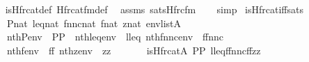 \begin{isabellebody}
%
\isadelimproof
\ \ %
\endisadelimproof
%
\isatagproof
{}\isamarkupfalse%
\ is{\isacharunderscore}{\kern0pt}Hfrc{\isacharunderscore}{\kern0pt}at{\isacharunderscore}{\kern0pt}def\ Hfrc{\isacharunderscore}{\kern0pt}at{\isacharunderscore}{\kern0pt}fm{\isacharunderscore}{\kern0pt}def\ \isamarkupfalse%
\ assms\ sats{\isacharunderscore}{\kern0pt}Hfrc{\isacharunderscore}{\kern0pt}fm\isanewline
\ \ \isamarkupfalse%
\ simp%
\endisatagproof
{\isafoldproof}%
%
\isadelimproof
\isanewline
%
\endisadelimproof
\isanewline
{}\isamarkupfalse%
\ is{\isacharunderscore}{\kern0pt}Hfrc{\isacharunderscore}{\kern0pt}at{\isacharunderscore}{\kern0pt}iff{\isacharunderscore}{\kern0pt}sats{\isacharcolon}{\kern0pt}\isanewline
\ \ \isanewline
\ \ \ \ {\isachardoublequoteopen}P{\isasymin}nat{\isachardoublequoteclose}\ {\isachardoublequoteopen}leq{\isasymin}nat{\isachardoublequoteclose}\ {\isachardoublequoteopen}fnnc{\isasymin}nat{\isachardoublequoteclose}\ {\isachardoublequoteopen}f{\isasymin}nat{\isachardoublequoteclose}\ {\isachardoublequoteopen}z{\isasymin}nat{\isachardoublequoteclose}\ {\isachardoublequoteopen}env{\isasymin}list{\isacharparenleft}{\kern0pt}A{\isacharparenright}{\kern0pt}{\isachardoublequoteclose}\isanewline
\ \ \ \ {\isachardoublequoteopen}nth{\isacharparenleft}{\kern0pt}P{\isacharcomma}{\kern0pt}env{\isacharparenright}{\kern0pt}\ {\isacharequal}{\kern0pt}\ PP{\isachardoublequoteclose}\ \ {\isachardoublequoteopen}nth{\isacharparenleft}{\kern0pt}leq{\isacharcomma}{\kern0pt}env{\isacharparenright}{\kern0pt}\ {\isacharequal}{\kern0pt}\ lleq{\isachardoublequoteclose}\ {\isachardoublequoteopen}nth{\isacharparenleft}{\kern0pt}fnnc{\isacharcomma}{\kern0pt}env{\isacharparenright}{\kern0pt}\ {\isacharequal}{\kern0pt}\ ffnnc{\isachardoublequoteclose}\isanewline
\ \ \ \ {\isachardoublequoteopen}nth{\isacharparenleft}{\kern0pt}f{\isacharcomma}{\kern0pt}env{\isacharparenright}{\kern0pt}\ {\isacharequal}{\kern0pt}\ ff{\isachardoublequoteclose}\ {\isachardoublequoteopen}nth{\isacharparenleft}{\kern0pt}z{\isacharcomma}{\kern0pt}env{\isacharparenright}{\kern0pt}\ {\isacharequal}{\kern0pt}\ zz{\isachardoublequoteclose}\isanewline
\ \ \isanewline
\ \ \ \ {\isachardoublequoteopen}is{\isacharunderscore}{\kern0pt}Hfrc{\isacharunderscore}{\kern0pt}at{\isacharparenleft}{\kern0pt}{\isacharhash}{\kern0pt}{\isacharhash}{\kern0pt}A{\isacharcomma}{\kern0pt}\ PP{\isacharcomma}{\kern0pt}\ lleq{\isacharcomma}{\kern0pt}ffnnc{\isacharcomma}{\kern0pt}ff{\isacharcomma}{\kern0pt}zz{\isacharparenright}{\kern0pt}\isanewline

\end{isabellebody}
